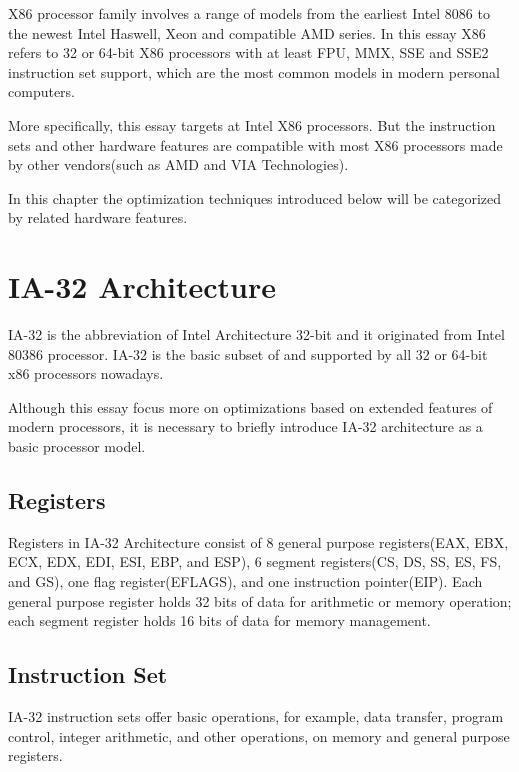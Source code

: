 \documentclass[a4paper]{report}
\begin{document}
	X86 processor family involves a range of models from the earliest Intel 8086 to the newest Intel Haswell, Xeon and compatible AMD series. In this essay X86 refers to 32 or 64-bit X86 processors with at least FPU, MMX, SSE and SSE2 instruction set support, which are the most common models in modern personal computers.
	
	More specifically, this essay targets at Intel X86 processors. But the instruction sets and other hardware features are compatible with most X86 processors made by other vendors(such as AMD and VIA Technologies).
	
	In this chapter the optimization techniques introduced below will be categorized by related hardware features.

\section{IA-32 Architecture} \indent

	IA-32 is the abbreviation of Intel Architecture 32-bit and it originated from Intel 80386 processor. IA-32 is the basic subset of and supported by all 32 or 64-bit x86 processors nowadays.

	Although this essay focus more on optimizations based on extended features of modern processors, it is necessary to briefly introduce IA-32 architecture as a basic processor model.

\subsection{Registers} \indent

	Registers in IA-32 Architecture consist of 8 general purpose registers(EAX, EBX, ECX, EDX, EDI, ESI, EBP, and ESP), 6 segment registers(CS, DS, SS, ES, FS, and GS), one flag register(EFLAGS), and one instruction pointer(EIP). Each general purpose register holds 32 bits of data for arithmetic or memory operation; each segment register holds 16 bits of data for memory management. \cite{inteldev}  %

\subsection{Instruction Set} \indent

	IA-32 instruction sets offer basic operations, for example, data transfer, program control, integer arithmetic, and other operations, on memory and general purpose registers. \cite{inteldev}%
	
\end{document}
